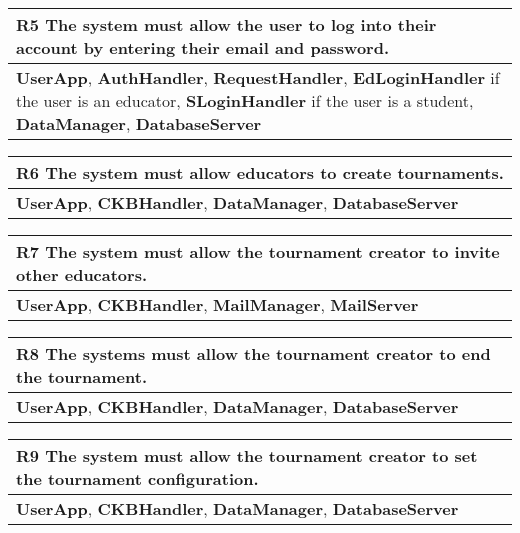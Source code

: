 \begin{table}[H]
    \begin{tabularx}{\textwidth}{X}
        \toprule
        \textbf{R5} The system must allow the user to log into their account by entering their email and password. \\ \midrule
        \textbf{UserApp}, \textbf{AuthHandler}, \textbf{RequestHandler}, \textbf{EdLoginHandler} if the user is an educator, \textbf{SLoginHandler} if the user is a student,
        \textbf{DataManager}, \textbf{DatabaseServer} \\                  
    \end{tabularx}
\end{table}

\begin{table}[H]
    \begin{tabularx}{\textwidth}{X}
        \toprule
        \textbf{R6} The system must allow educators to create tournaments. \\ \midrule
        \textbf{UserApp}, \textbf{CKBHandler}, \textbf{DataManager}, \textbf{DatabaseServer}                      \\
    \end{tabularx}
\end{table}

\begin{table}[H]
    \begin{tabularx}{\textwidth}{X}
        \toprule
        \textbf{R7} The system must allow the tournament creator to invite other educators. \\ \midrule
        \textbf{UserApp}, \textbf{CKBHandler}, \textbf{MailManager}, \textbf{MailServer}                    \\
    \end{tabularx}
\end{table}

\begin{table}[H]
    \begin{tabularx}{\textwidth}{X}
        \toprule
        \textbf{R8} The systems must allow the tournament creator to end the tournament. \\ \midrule
        \textbf{UserApp}, \textbf{CKBHandler}, \textbf{DataManager}, \textbf{DatabaseServer}                   \\
    \end{tabularx}
\end{table}

\begin{table}[H]
    \begin{tabularx}{\textwidth}{X}
        \toprule
        \textbf{R9} The system must allow the tournament creator to set the tournament configuration. \\ \midrule
        \textbf{UserApp}, \textbf{CKBHandler}, \textbf{DataManager}, \textbf{DatabaseServer} \\
    \end{tabularx}
\end{table}


